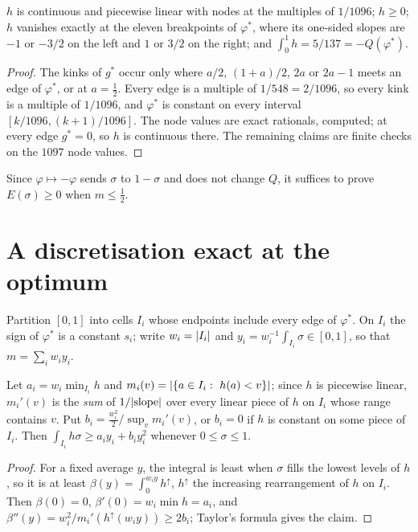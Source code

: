 \documentclass[11pt]{article}
\newcommand{\vphi}{\varphi}
\begin{document}
\begin{lemma}\label{lem:h}
$h$ is continuous and piecewise linear with nodes at the multiples of $1/1096$; $h\ge0$; $h$ vanishes exactly at the eleven breakpoints of $\vphi^*$, where its one-sided slopes are $-1$ or $-3/2$ on the left and $1$ or $3/2$ on the right; and $\int_0^1h=5/137=-Q(\vphi^*)$.
\end{lemma}
\begin{proof}
The kinks of $g^*$ occur only where $a/2$, $(1+a)/2$, $2a$ or $2a-1$ meets an edge of $\vphi^*$, or at $a=\frac12$. Every edge is a multiple of $1/548=2/1096$, so every kink is a multiple of $1/1096$, and $\vphi^*$ is constant on every interval $[k/1096,(k+1)/1096]$. The node values are exact rationals, computed; at every edge $g^*=0$, so $h$ is continuous there. The remaining claims are finite checks on the $1097$ node values.
\end{proof}

Since $\vphi\mapsto-\vphi$ sends $\sigma$ to $1-\sigma$ and does not change $Q$, it suffices to prove $E(\sigma)\ge0$ when $m\le\frac12$.

\section{A discretisation exact at the optimum}\label{sec:disc}

Partition $[0,1]$ into cells $I_i$ whose endpoints include every edge of $\vphi^*$. On $I_i$ the sign of $\vphi^*$ is a constant $s_i$; write $w_i=\lvert I_i \rvert$ and $y_i=w_i^{-1}\int_{I_i}\sigma\in[0,1]$, so that $m=\sum_iw_iy_i$.

\begin{lemma}[bathtub]\label{lem:bath}
Let $a_i=w_i\min_{I_i}h$ and $m_i(v)=\abs{\{a\in I_i:\ h(a)<v\}}$; since $h$ is piecewise linear, $m_i'(v)$ is the \emph{sum} of $1/\lvert \text{slope} \rvert$ over every linear piece of $h$ on $I_i$ whose range contains $v$. Put $b_i=\frac{w_i^2}{2}\big/\sup_v m_i'(v)$, or $b_i=0$ if $h$ is constant on some piece of $I_i$. Then $\int_{I_i}h\sigma\ge a_iy_i+b_iy_i^2$ whenever $0\le\sigma\le1$.
\end{lemma}
\begin{proof}
For a fixed average $y$, the integral is least when $\sigma$ fills the lowest levels of $h$, so it is at least $\beta(y)=\int_0^{w_iy}h^\uparrow$, $h^\uparrow$ the increasing rearrangement of $h$ on $I_i$. Then $\beta(0)=0$, $\beta'(0)=w_i\min h=a_i$, and $\beta''(y)=w_i^2/m_i'(h^\uparrow(w_iy))\ge2b_i$; Taylor's formula gives the claim.
\end{proof}
\end{document}
